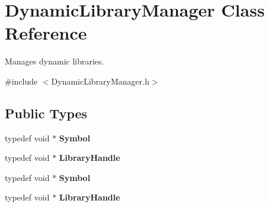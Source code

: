 \hypertarget{class_dynamic_library_manager}{\section{Dynamic\+Library\+Manager Class Reference}
\label{class_dynamic_library_manager}
}


Manages dynamic libraries.  




{\ttfamily \#include $<$Dynamic\+Library\+Manager.\+h$>$}

\subsection*{Public Types}
\begin{DoxyCompactItemize}
\item 
\hypertarget{class_dynamic_library_manager_abb1022f448f94bf40c890d38ea41c52b}{typedef void $\ast$ {\bfseries Symbol}}\label{class_dynamic_library_manager_abb1022f448f94bf40c890d38ea41c52b}

\item 
\hypertarget{class_dynamic_library_manager_aa47563bb349a44ec41af6464300e0688}{typedef void $\ast$ {\bfseries Library\+Handle}}\label{class_dynamic_library_manager_aa47563bb349a44ec41af6464300e0688}

\item 
\hypertarget{class_dynamic_library_manager_abb1022f448f94bf40c890d38ea41c52b}{typedef void $\ast$ {\bfseries Symbol}}\label{class_dynamic_library_manager_abb1022f448f94bf40c890d38ea41c52b}

\item 
\hypertarget{class_dynamic_library_manager_aa47563bb349a44ec41af6464300e0688}{typedef void $\ast$ {\bfseries Library\+Handle}}\label{class_dynamic_library_manager_aa47563bb349a44ec41af6464300e0688}

\end{DoxyCompactItemize}
